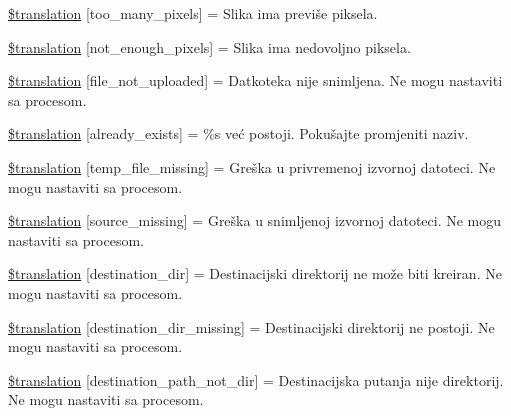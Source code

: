 \begin{DoxyCompactItemize}
\item 
\hyperlink{class_8upload_8hr___h_r_8php_aa4051ef64e94a3f8295c63cf85544016}{\$translation} \mbox{[}\textquotesingle{}too\+\_\+many\+\_\+pixels\textquotesingle{}\mbox{]} = \textquotesingle{}Slika ima previše piksela.\textquotesingle{}
\item 
\hyperlink{class_8upload_8hr___h_r_8php_a1fe342c27ce61f4ff4e0120ba647033e}{\$translation} \mbox{[}\textquotesingle{}not\+\_\+enough\+\_\+pixels\textquotesingle{}\mbox{]} = \textquotesingle{}Slika ima nedovoljno piksela.\textquotesingle{}
\item 
\hyperlink{class_8upload_8hr___h_r_8php_a4ce76e7be0b3a03c2b47f6d70c21832e}{\$translation} \mbox{[}\textquotesingle{}file\+\_\+not\+\_\+uploaded\textquotesingle{}\mbox{]} = \textquotesingle{}Datkoteka nije snimljena. Ne mogu nastaviti sa procesom.\textquotesingle{}
\item 
\hyperlink{class_8upload_8hr___h_r_8php_afd84e910217f04139f567c41e292afa5}{\$translation} \mbox{[}\textquotesingle{}already\+\_\+exists\textquotesingle{}\mbox{]} = \textquotesingle{}\%s već postoji. Pokušajte promjeniti naziv.\textquotesingle{}
\item 
\hyperlink{class_8upload_8hr___h_r_8php_ab0fa87a88aba2624004581eed0633325}{\$translation} \mbox{[}\textquotesingle{}temp\+\_\+file\+\_\+missing\textquotesingle{}\mbox{]} = \textquotesingle{}Greška u privremenoj izvornoj datoteci. Ne mogu nastaviti sa procesom.\textquotesingle{}
\item 
\hyperlink{class_8upload_8hr___h_r_8php_aceaaf7355acaaf10f0ae60378d03c468}{\$translation} \mbox{[}\textquotesingle{}source\+\_\+missing\textquotesingle{}\mbox{]} = \textquotesingle{}Greška u snimljenoj izvornoj datoteci. Ne mogu nastaviti sa procesom.\textquotesingle{}
\item 
\hyperlink{class_8upload_8hr___h_r_8php_aff2427c72a2598aefa6d58df1dd18b08}{\$translation} \mbox{[}\textquotesingle{}destination\+\_\+dir\textquotesingle{}\mbox{]} = \textquotesingle{}Destinacijski direktorij ne može biti kreiran. Ne mogu nastaviti sa procesom.\textquotesingle{}
\item 
\hyperlink{class_8upload_8hr___h_r_8php_a9ef28d3cf09942c6c0a1e77fa09185e8}{\$translation} \mbox{[}\textquotesingle{}destination\+\_\+dir\+\_\+missing\textquotesingle{}\mbox{]} = \textquotesingle{}Destinacijski direktorij ne postoji. Ne mogu nastaviti sa procesom.\textquotesingle{}
\item 
\hyperlink{class_8upload_8hr___h_r_8php_a5704a67137126e8c87b7a364175929d4}{\$translation} \mbox{[}\textquotesingle{}destination\+\_\+path\+\_\+not\+\_\+dir\textquotesingle{}\mbox{]} = \textquotesingle{}Destinacijska putanja nije direktorij. Ne mogu nastaviti sa procesom.\textquotesingle{}

\end{DoxyCompactItemize}
